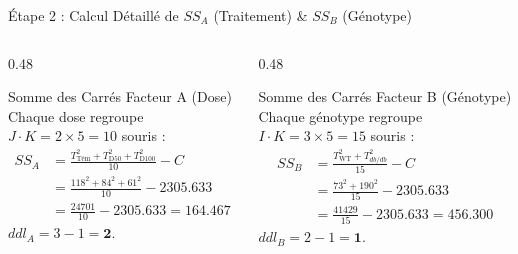 \documentclass[aspectratio=169,10pt]{beamer}
\begin{document}
\begin{frame}{Étape 2 : Calcul Détaillé de $SS_A$ (Traitement) \& $SS_B$ (Génotype)}
  \begin{columns}[onlytextwidth, T]
    \begin{column}{0.48\linewidth}
      \begin{conceptbox}{Somme des Carrés Facteur A (Dose)}
        \small
        Chaque dose regroupe $J \cdot K = 2 \times 5 = 10$ souris :
        \begin{align*}
          SS_A &= \frac{T_{\text{Tém}}^2 + T_{\text{D50}}^2 + T_{\text{D100}}^2}{10} - C \\
          &= \frac{118^2 + 84^2 + 61^2}{10} - 2305.633 \\
          &= \frac{24701}{10} - 2305.633 = \mathbf{164.467}
        \end{align*}
        $ddl_A = 3 - 1 = \mathbf{2}$.
      \end{conceptbox}
    \end{column}
    \begin{column}{0.48\linewidth}
      \begin{conceptbox}{Somme des Carrés Facteur B (Génotype)}
        \small
        Chaque génotype regroupe $I \cdot K = 3 \times 5 = 15$ souris :
        \begin{align*}
          SS_B &= \frac{T_{\text{WT}}^2 + T_{db/db}^2}{15} - C \\
          &= \frac{73^2 + 190^2}{15} - 2305.633 \\
          &= \frac{41429}{15} - 2305.633 = \mathbf{456.300}
        \end{align*}
        $ddl_B = 2 - 1 = \mathbf{1}$.
      \end{conceptbox}
    \end{column}
  \end{columns}
\end{frame}
\end{document}
